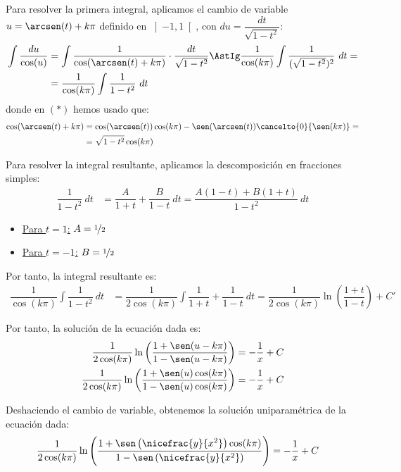 \begin{ejercicio}
\begin{enumerate}
        Para resolver la primera integral, aplicamos el cambio de variable $u=\arcsen(t)+k\pi$ definido en $\left]-1, 1\right[$, con $du=\dfrac{dt}{\sqrt{1-t^2}}$:
        \begin{align*}
            \int \dfrac{du}{\cos(u)} &= \int \dfrac{1}{\cos(\arcsen(t)+k\pi)}\cdot \dfrac{dt}{\sqrt{1-t^2}} \AstIg \dfrac{1}{\cos(k\pi)}\int \dfrac{1}{(\sqrt{1-t^2})^2}~dt =\\&= \dfrac{1}{\cos(k\pi)}\int \dfrac{1}{1-t^2}~dt
        \end{align*}
        donde en $(\ast)$ hemos usado que:
        \begin{align*}
            \cos(\arcsen(t)+k\pi) &= \cos(\arcsen(t))\cos(k\pi) - \sen(\arcsen(t))\cancelto{0}{\sen(k\pi)} =\\&= \sqrt{1-t^2}\cos(k\pi)
        \end{align*}

        Para resolver la integral resultante, aplicamos la descomposición en fracciones simples:
        \begin{align*}
            \dfrac{1}{1-t^2}~dt &= \dfrac{A}{1+t} + \dfrac{B}{1-t}~dt = \dfrac{A(1-t)+B(1+t)}{1-t^2}~dt
        \end{align*}
        \begin{itemize}
            \item \ul{Para $t=1$:} $A=\nicefrac{1}{2}$
            \item \ul{Para $t=-1$:} $B=\nicefrac{1}{2}$
        \end{itemize}

        Por tanto, la integral resultante es:
        \begin{align*}
            \dfrac{1}{\cos(k\pi)}\int \dfrac{1}{1-t^2}~dt &= \dfrac{1}{2\cos(k\pi)}\int \dfrac{1}{1+t} + \dfrac{1}{1-t}~dt = \dfrac{1}{2\cos(k\pi)}\ln\left(\dfrac{1+t}{1-t}\right) + C'
        \end{align*}

        Por tanto, la solución de la ecuación dada es:
        \begin{align*}
            \dfrac{1}{2\cos(k\pi)}\ln\left(\dfrac{1+\sen(u-k\pi)}{1-\sen(u-k\pi)}\right) &= -\dfrac{1}{x} + C\\
            \dfrac{1}{2\cos(k\pi)}\ln\left(\dfrac{1+\sen(u)\cos(k\pi)}{1-\sen(u)\cos(k\pi)}\right) &= -\dfrac{1}{x} + C
        \end{align*}

        Deshaciendo el cambio de variable, obtenemos la solución uniparamétrica de la ecuación dada:
        \begin{align*}
            \dfrac{1}{2\cos(k\pi)}\ln\left(\dfrac{1+\sen\left(\nicefrac{y}{x^2}\right)\cos(k\pi)}{1-\sen\left(\nicefrac{y}{x^2}\right)}\right) &= -\dfrac{1}{x} + C
        \end{align*}
        

\end{enumerate}
\end{ejercicio}
